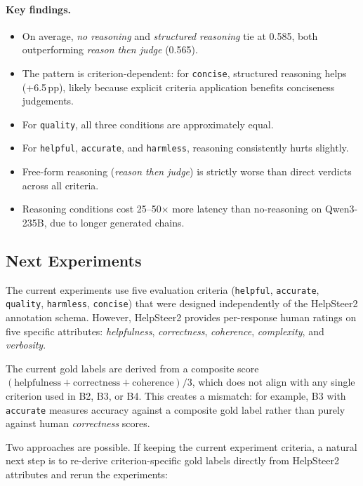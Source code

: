 \documentclass[11pt,a4paper]{article}
\begin{document}
\paragraph{Key findings.}
\begin{itemize}[nosep]
  \item On average, \textit{no reasoning} and \textit{structured reasoning} tie
        at 0.585, both outperforming \textit{reason then judge} (0.565).
  \item The pattern is criterion-dependent: for \texttt{concise}, structured
        reasoning helps (+6.5\,pp), likely because explicit criteria application
        benefits conciseness judgements.
  \item For \texttt{quality}, all three conditions are approximately equal.
  \item For \texttt{helpful}, \texttt{accurate}, and \texttt{harmless}, reasoning
        consistently hurts slightly.
  \item Free-form reasoning (\textit{reason then judge}) is strictly worse than
        direct verdicts across all criteria.
  \item Reasoning conditions cost 25--50$\times$ more latency than no-reasoning
        on Qwen3-235B, due to longer generated chains.
\end{itemize}


\subsection{Next Experiments}\label{sec:next}

The current experiments use five evaluation criteria (\texttt{helpful},
\texttt{accurate}, \texttt{quality}, \texttt{harmless}, \texttt{concise})
that were designed independently of the HelpSteer2 annotation schema. However,
HelpSteer2 provides per-response human ratings on five specific attributes:
\textit{helpfulness}, \textit{correctness}, \textit{coherence},
\textit{complexity}, and \textit{verbosity}.

The current gold labels are derived from a composite score
$(\text{helpfulness} + \text{correctness} + \text{coherence}) / 3$, which
does not align with any single criterion used in B2, B3, or B4. This creates
a mismatch: for example, B3 with \texttt{accurate} measures accuracy against
a composite gold label rather than purely against human \textit{correctness}
scores.

Two approaches are possible. If keeping the current experiment criteria, a
natural next step is to re-derive criterion-specific gold labels directly
from HelpSteer2 attributes and rerun the experiments:
\end{document}
